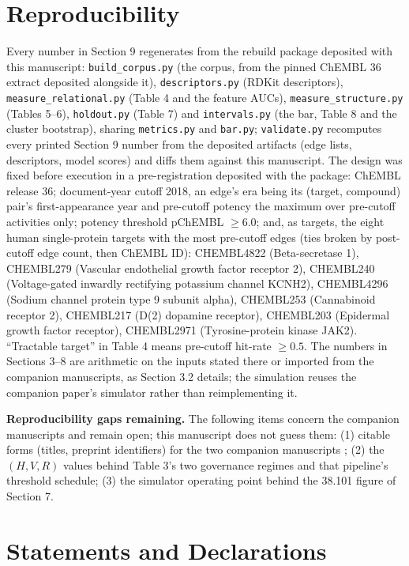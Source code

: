 \documentclass[11pt]{article}
\begin{document}
\section*{Reproducibility}

Every number in Section 9 regenerates from the rebuild package
deposited with this manuscript: \texttt{build\_corpus.py} (the corpus,
from the pinned ChEMBL 36 extract deposited alongside it),
\texttt{descriptors.py} (RDKit descriptors), \texttt{measure\_relational.py}
(Table 4 and the feature AUCs), \texttt{measure\_structure.py} (Tables 5--6),
\texttt{holdout.py} (Table 7) and \texttt{intervals.py} (the bar, Table 8 and
the cluster bootstrap), sharing \texttt{metrics.py} and \texttt{bar.py};
\texttt{validate.py} recomputes every printed Section 9 number from the
deposited artifacts (edge lists, descriptors, model scores) and diffs
them against this manuscript. The design was fixed before execution in
a pre-registration deposited with the package: ChEMBL release 36;
document-year cutoff 2018, an edge's era being its (target, compound)
pair's first-appearance year and pre-cutoff potency the maximum over
pre-cutoff activities only; potency threshold pChEMBL $\geq 6.0$; and, as
targets, the eight human single-protein targets with the most
pre-cutoff edges (ties broken by post-cutoff edge count, then ChEMBL
ID): CHEMBL4822 (Beta-secretase 1), CHEMBL279 (Vascular endothelial growth factor receptor 2), CHEMBL240 (Voltage-gated inwardly rectifying potassium channel KCNH2), CHEMBL4296 (Sodium channel protein type 9 subunit alpha), CHEMBL253 (Cannabinoid receptor 2), CHEMBL217 (D(2) dopamine receptor), CHEMBL203 (Epidermal growth factor receptor), CHEMBL2971 (Tyrosine-protein kinase JAK2). ``Tractable target'' in Table 4 means pre-cutoff
hit-rate $\geq 0.5$. The numbers in Sections 3--8 are arithmetic on the
inputs stated there or imported from the companion manuscripts, as
Section 3.2 details; the simulation reuses the companion paper's
simulator rather than reimplementing it.

\textbf{Reproducibility gaps remaining.} The following items concern
the companion manuscripts and remain open; this manuscript does not
guess them: (1) citable forms (titles, preprint identifiers) for the
two companion manuscripts \cite{ghosh-throughput, ghosh-criterion};
(2) the $(H, V, R)$ values behind Table 3's two governance regimes and
that pipeline's threshold schedule; (3) the
simulator operating point behind the 38.101 figure of Section 7.

\section*{Statements and Declarations}
\end{document}

